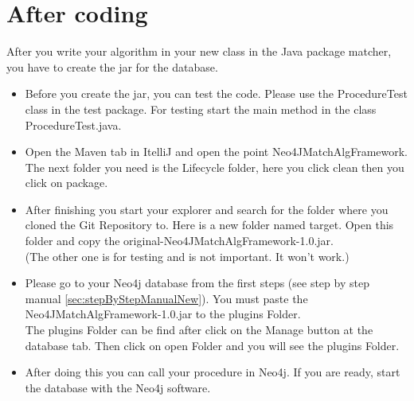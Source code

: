 \section{After coding}\label{sec:afterProgrammingNew}
After you write your algorithm in your new class in the Java package matcher, you have to create the \glqq jar\grqq{} for the database.
\begin{itemize}
	\item Before you create the jar, you can test the code. Please use the \glqq ProcedureTest\grqq{} class in the test package. For testing start the main method in the class \glqq ProcedureTest.java\grqq{}.
	\item Open the Maven tab in \glqq ItelliJ \grqq{} and open the point \glqq Neo4JMatchAlgFramework\grqq{}. The next folder you need is the \glqq Lifecycle\grqq{} folder, here you click \glqq clean\grqq{} then you click on \glqq package\grqq{}.
	\item After finishing you start your explorer and search for the folder where you cloned the \glqq Git Repository\grqq{} to. Here is a new folder named target. Open this folder and copy the \glqq original-Neo4JMatchAlgFramework-1.0.jar\grqq{}. \\
	(The other one is for testing and is not important. It won't work.)
	\item Please go to your Neo4j database from the first steps (see step by step manual \ref{sec:stepByStepManualNew}).
	You must paste the \glqq Neo4JMatchAlgFramework-1.0.jar\grqq{} to the \glqq plugins\grqq{} Folder. 
	\\The \glqq plugins\grqq{} Folder can be find after click on the \glqq Manage\grqq{} button at the database tab. Then click on open Folder and you will see the \glqq plugins\grqq{} Folder. 
	\item After doing this you can call your procedure in Neo4j. If you are ready, start the database with the Neo4j software.
\end{itemize}

